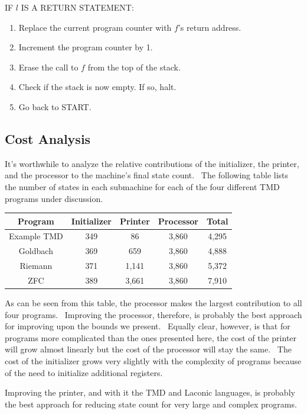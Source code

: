 \documentclass[11pt]{article}
\newcommand{\statenum}{7,910 }
\newcommand{\gbstatenum}{4,888 }
\newcommand{\rmstatenum}{5,372 }
\begin{document}
\noindent IF $l$ IS A RETURN STATEMENT:
\begin{enumerate}
\item Replace the current program counter with $f$'s return address.
\item Increment the program counter by 1.
\item Erase the call to $f$ from the top of the stack.
\item Check if the stack is now empty. If so, halt.
\item Go back to START.
\end{enumerate}

\subsection{Cost Analysis} \label{sec:cost}

It's worthwhile to analyze the relative contributions of the initializer, the printer, and the processor to the machine's final state count. \ The following table lists the number of states in each submachine for each of the four different TMD programs under discussion.

\begin{center}
    \begin{tabular}{||c c c c c||}
    \hline
    Program & Initializer & Printer & Processor & Total \\ [0.5ex]
    \hline\hline
    Example TMD & 349 & 86 & 3,860 & 4,295 \\
    \hline
    Goldbach & 369 & 659 & 3,860 & \gbstatenum \\
    \hline
    Riemann & 371 & 1,141 & 3,860 & \rmstatenum \\
    \hline
    ZFC & 389 & 3,661 & 3,860 & \statenum \\
    \hline
    \end{tabular}
\end{center}

As can be seen from this table, the processor makes the largest contribution to all four programs. \ Improving the processor, therefore, is probably the best approach for improving upon the bounds we present. \ Equally clear, however, is that for programs more complicated than the ones presented here, the cost of the printer will grow almost linearly but the cost of the processor will stay the same. \ The cost of the initializer grows very slightly with the complexity of programs because of the need to initialize additional registers.

Improving the printer, and with it the TMD and Laconic languages, is probably the best approach for reducing state count for very large and complex programs.
\end{document}
